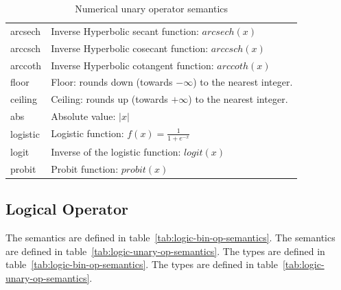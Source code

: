 \begin{table}[ht!]
\begin{center}
\begin{tabular}{ll}
arcsech & Inverse  Hyperbolic secant function: $arcsech(x)$\\
arccsch & Inverse  Hyperbolic cosecant function: $arccsch(x)$\\
arccoth & Inverse  Hyperbolic cotangent function: $arccoth(x)$\\
floor & Floor: rounds down (towards $-\infty$) to the nearest integer.\\
ceiling & Ceiling: rounds up (towards $+\infty$) to the nearest integer.\\
abs & Absolute value: $|x|$ \\
logistic & Logistic function: $f(x) = \frac{1}{1 + e^{-x}}$\\
logit & Inverse of the logistic function: $\mathit{logit}(x)$\\
probit & Probit function: $\mathit{probit}(x)$\\\bottomrule
\end{tabular}
\end{center}
\caption{Numerical unary operator semantics}
\label{tab:unary-op-semantics}
\end{table}%



\subsection{Logical Operator}

\begin{valrules}
 The semantics are defined in
table~\ref{tab:logic-bin-op-semantics}.
 The semantics are defined in
table~\ref{tab:logic-unary-op-semantics}.
 The types are defined in table~\ref{tab:logic-bin-op-semantics}.
 The types are defined in table~\ref{tab:logic-unary-op-semantics}.
\end{valrules}

